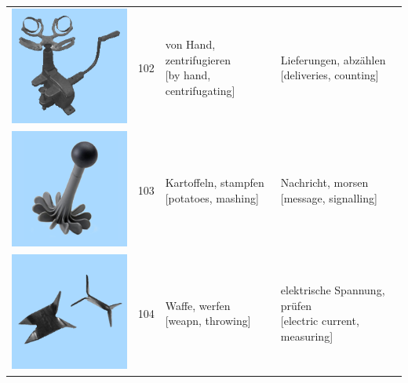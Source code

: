 \documentclass[
  english,
  doc,12pt,twoside,floatsintext]{apa7}
\begin{document}
\begin{center}
\begin{ThreePartTable}
{\begin{longtable}{llll}
\includegraphics[valign=c, scale=0.23]{../materials/unfamiliar/102.png} & 102 & \makecell[l]{von Hand, zentrifugieren\\{[by hand, centrifugating]}} & \makecell[l]{Lieferungen, abzählen\\{[deliveries, counting]}}\\
\includegraphics[valign=c, scale=0.23]{../materials/unfamiliar/103.png} & 103 & \makecell[l]{Kartoffeln, stampfen\\{[potatoes, mashing]}} & \makecell[l]{Nachricht, morsen\\{[message, signalling]}}\\
\includegraphics[valign=c, scale=0.23]{../materials/unfamiliar/104.png} & 104 & \makecell[l]{Waffe, werfen\\{[weapn, throwing]}} & \makecell[l]{elektrische Spannung, prüfen\\{[electric current, measuring]}}\\

\end{longtable}}
\end{ThreePartTable}
\end{center}
\end{document}
